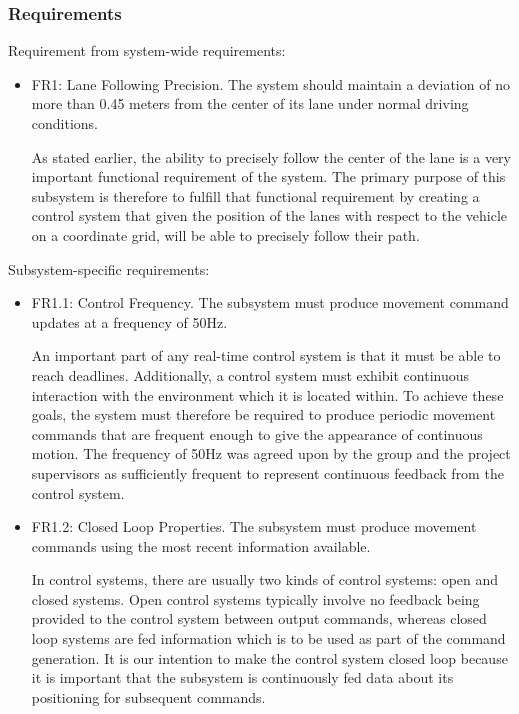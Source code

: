 \documentclass[titlepage,draft]{article}
\begin{document}
{\subsubsection{Requirements}
Requirement from system-wide requirements:

\begin{itemize}
	\item FR1: Lane Following Precision. The system should maintain a deviation of no more than 0.45 meters from the center of its lane under normal driving conditions.

	      As stated earlier, the ability to precisely follow the center of the lane is a very important functional requirement of the system. The primary purpose of this subsystem is therefore to fulfill that functional requirement by creating a control system that given the position of the lanes with respect to the vehicle on a coordinate grid, will be able to precisely follow their path.

\end{itemize}
Subsystem-specific requirements:
\begin{itemize}

	\item FR1.1: Control Frequency.
	      The subsystem must produce movement command updates at a frequency of 50Hz.

	      An important part of any real-time control system is that it must be able to reach deadlines. Additionally, a control system must exhibit continuous interaction with the environment which it is located within. To achieve these goals, the system must therefore be required to produce periodic movement commands that are frequent enough to give the appearance of continuous motion. The frequency of 50Hz was agreed upon by the group and the project supervisors as sufficiently frequent to represent continuous feedback from the control system.

	\item FR1.2: Closed Loop Properties.
	      The subsystem must produce movement commands using the most recent information available.

	      In control systems, there are usually two kinds of control systems: open and closed systems. Open control systems typically involve no feedback being provided to the control system between output commands, whereas closed loop systems are fed information which is to be used as part of the command generation. It is our intention to make the control system closed loop because it is important that the subsystem is continuously fed data about its positioning for subsequent commands.


\end{itemize}}
\end{document}
